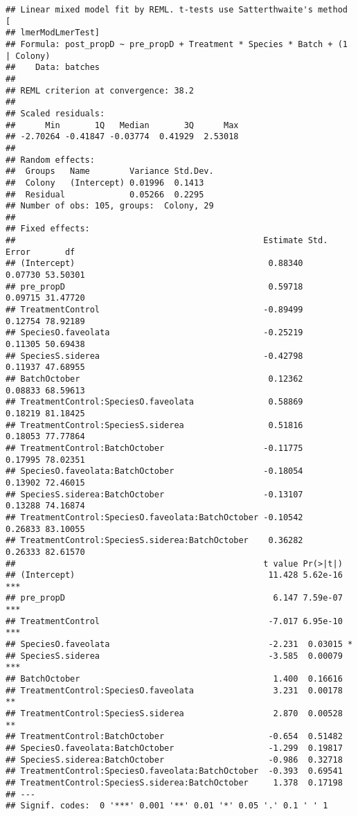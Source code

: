 \documentclass[]{article}
\begin{document}
\begin{verbatim}
## Linear mixed model fit by REML. t-tests use Satterthwaite's method [
## lmerModLmerTest]
## Formula: post_propD ~ pre_propD + Treatment * Species * Batch + (1 | Colony)
##    Data: batches
## 
## REML criterion at convergence: 38.2
## 
## Scaled residuals: 
##      Min       1Q   Median       3Q      Max 
## -2.70264 -0.41847 -0.03774  0.41929  2.53018 
## 
## Random effects:
##  Groups   Name        Variance Std.Dev.
##  Colony   (Intercept) 0.01996  0.1413  
##  Residual             0.05266  0.2295  
## Number of obs: 105, groups:  Colony, 29
## 
## Fixed effects:
##                                                  Estimate Std. Error       df
## (Intercept)                                       0.88340    0.07730 53.50301
## pre_propD                                         0.59718    0.09715 31.47720
## TreatmentControl                                 -0.89499    0.12754 78.92189
## SpeciesO.faveolata                               -0.25219    0.11305 50.69438
## SpeciesS.siderea                                 -0.42798    0.11937 47.68955
## BatchOctober                                      0.12362    0.08833 68.59613
## TreatmentControl:SpeciesO.faveolata               0.58869    0.18219 81.18425
## TreatmentControl:SpeciesS.siderea                 0.51816    0.18053 77.77864
## TreatmentControl:BatchOctober                    -0.11775    0.17995 78.02351
## SpeciesO.faveolata:BatchOctober                  -0.18054    0.13902 72.46015
## SpeciesS.siderea:BatchOctober                    -0.13107    0.13288 74.16874
## TreatmentControl:SpeciesO.faveolata:BatchOctober -0.10542    0.26833 83.10055
## TreatmentControl:SpeciesS.siderea:BatchOctober    0.36282    0.26333 82.61570
##                                                  t value Pr(>|t|)    
## (Intercept)                                       11.428 5.62e-16 ***
## pre_propD                                          6.147 7.59e-07 ***
## TreatmentControl                                  -7.017 6.95e-10 ***
## SpeciesO.faveolata                                -2.231  0.03015 *  
## SpeciesS.siderea                                  -3.585  0.00079 ***
## BatchOctober                                       1.400  0.16616    
## TreatmentControl:SpeciesO.faveolata                3.231  0.00178 ** 
## TreatmentControl:SpeciesS.siderea                  2.870  0.00528 ** 
## TreatmentControl:BatchOctober                     -0.654  0.51482    
## SpeciesO.faveolata:BatchOctober                   -1.299  0.19817    
## SpeciesS.siderea:BatchOctober                     -0.986  0.32718    
## TreatmentControl:SpeciesO.faveolata:BatchOctober  -0.393  0.69541    
## TreatmentControl:SpeciesS.siderea:BatchOctober     1.378  0.17198    
## ---
## Signif. codes:  0 '***' 0.001 '**' 0.01 '*' 0.05 '.' 0.1 ' ' 1
\end{verbatim}
\end{document}
